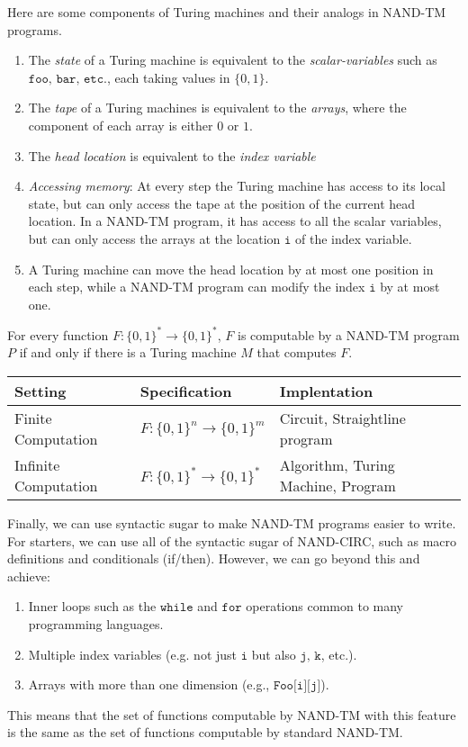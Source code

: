 \documentclass{article}
\begin{document}
  Here are some components of Turing machines and their analogs in NAND-TM programs. 
  \begin{enumerate}
      \item The \textit{state} of a Turing machine is equivalent to the \textit{scalar-variables} such as $\texttt{foo, bar, etc.}$, each taking values in $\{0,1\}$. 
      \item The \textit{tape} of a Turing machines is equivalent to the \textit{arrays}, where the component of each array is either $0$ or $1$. 
      \item The \textit{head location} is equivalent to the \textit{index variable}
      \item \textit{Accessing memory}: At every step the Turing machine has access to its local state, but can only access the tape at the position of the current head location. In a NAND-TM program, it has access to all the scalar variables, but can only access the arrays at the location $\texttt{i}$ of the index variable. 
      \item A Turing machine can move the head location by at most one position in each step, while a NAND-TM program can modify the index $\texttt{i}$ by at most one. 
  \end{enumerate}

  \begin{theorem}
  For every function $F: \{0,1\}^* \longrightarrow \{0,1\}^*$, $F$ is computable by a NAND-TM program $P$ if and only if there is a Turing machine $M$ that computes $F$. 
  \end{theorem}

  \begin{center}
  \begin{tabular}{l|l|l}
      Setting & Specification & Implentation \\
      \hline
      Finite Computation& $F: \{0,1\}^n \rightarrow \{0,1\}^m$ & Circuit, Straightline program \\
      Infinite Computation & $F: \{0,1\}^* \rightarrow \{0,1\}^*$ & Algorithm, Turing Machine, Program
  \end{tabular}
  \end{center}

  Finally, we can use syntactic sugar to make NAND-TM programs easier to write. For starters, we can use all of the syntactic sugar of NAND-CIRC, such as macro definitions and conditionals (if/then). However, we can go beyond this and achieve: 
  \begin{enumerate}
      \item Inner loops such as the $\texttt{while}$ and $\texttt{for}$ operations common to many programming languages. 
      \item Multiple index variables (e.g. not just $\texttt{i}$ but also $\texttt{j, k}$, etc.). 
      \item Arrays with more than one dimension (e.g., $\texttt{Foo[i][j]}$). 
  \end{enumerate}
  This means that the set of functions computable by NAND-TM with this feature is the same as the set of functions computable by standard NAND-TM.
\end{document}
